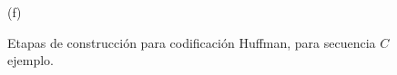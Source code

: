 \begin{figure}
\begin{minipage}{1\textwidth}
\begin{minipage}{0.45\textwidth}
    			(f)
    		\end{minipage}  
    	\end{minipage}
    	
    	 
    \caption{Etapas de construcción para codificación Huffman, para secuencia $C$ ejemplo.}%
    \label{fig:huffman2}
\end{figure}

